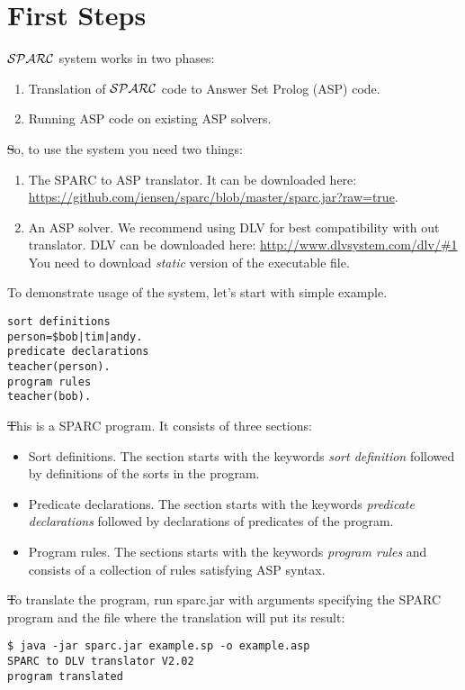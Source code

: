 \documentclass[12pt, letterpaper]{article}
\begin{document}
\section{First Steps}
${\cal SPARC}$ system  works in two phases:
\begin{enumerate}
\item Translation of ${\cal SPARC}$ code to Answer Set Prolog (ASP) code.
\item Running ASP code on existing ASP solvers.
\end{enumerate}

\st So, to use the system you need two things:
\begin{enumerate}
\item The SPARC to ASP translator. It can be downloaded here: \url{https://github.com/iensen/sparc/blob/master/sparc.jar?raw=true}.
\item An ASP solver. We recommend using DLV for best compatibility with out translator. DLV can be downloaded here:
 \url{http://www.dlvsystem.com/dlv/#1}
You need to download \textit{static} version of the executable file.

\end{enumerate}
To demonstrate usage of the system, let's start with simple example.
\begin{verbatim}
sort definitions
person=$bob|tim|andy.
predicate declarations
teacher(person).
program rules
teacher(bob).
\end{verbatim}

\st This is a SPARC program. It consists of three sections:
\begin{itemize}
 \item Sort definitions. The section starts with the keywords \textit{sort definition} followed by definitions of the sorts in the program.
 \item Predicate declarations. The section starts with the keywords \textit{predicate declarations} followed by declarations of predicates of the program.
 \item Program rules. The sections starts with the keywords \textit{program rules}  and consists of a collection of rules satisfying ASP syntax.
\end{itemize}

\st To translate the program, run sparc.jar with arguments specifying the SPARC program and the file where the translation will put its result:
\begin{verbatim}
$ java -jar sparc.jar example.sp -o example.asp
SPARC to DLV translator V2.02
program translated
\end{verbatim}
\end{document}
